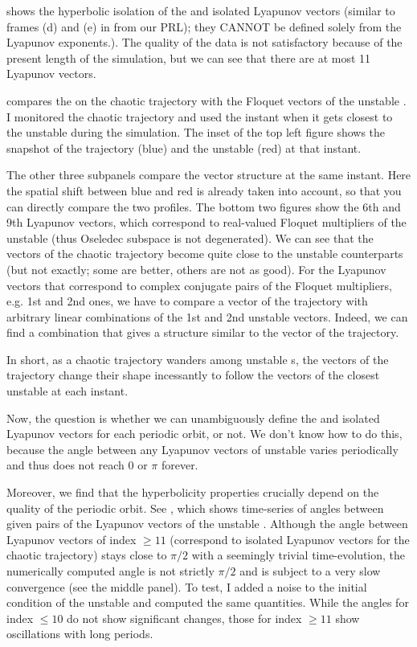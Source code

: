 \begin{description}
   shows the hyperbolic isolation of the {\entangled} and
  isolated Lyapunov vectors (similar to frames (d) and (e) in 
  from our PRL); they
  CANNOT be defined solely from the Lyapunov exponents.). The quality of
  the data is not satisfactory because of the present length of the
  simulation, but we can see that there are at most 11 {\entangled} Lyapunov vectors.


   compares the {\cLvs} on the
  chaotic trajectory with the Floquet vectors of the {unstable \po}. I monitored the
  chaotic trajectory and used the instant when it gets closest to the {unstable \po}
  during the simulation. The inset of the top left figure shows the
  snapshot of the trajectory (blue) and the {unstable \po} (red) at that instant.

  The other three subpanels compare the vector structure at the same
  instant. Here the spatial shift between blue and red is already taken
  into account, so that you can directly compare the two profiles. The
  bottom two figures show the 6th and 9th Lyapunov vectors, which correspond to
  real-valued Floquet multipliers of the {unstable \po} (thus Oseledec subspace is
  not degenerated). We can see that the vectors of the chaotic trajectory
  become quite close to the {unstable \po} counterparts (but not exactly; some are
  better, others are not as good). For the Lyapunov vectors that correspond
  to complex conjugate pairs of the Floquet multipliers, e.g. 1st and 2nd
  ones, we have to compare a vector of the trajectory with arbitrary
  linear combinations of the 1st and 2nd {unstable \po} vectors. Indeed, we can find
  a combination that gives a structure similar to the vector of the
  trajectory.

  In short, as a chaotic trajectory wanders among {unstable \po}s, the vectors of the
  trajectory change their shape incessantly to follow the vectors of the
  closest {unstable \po} at each instant.


  Now, the question is whether we can unambiguously define the {\entangled}
  and isolated Lyapunov vectors for each periodic orbit, or not. We don't know how to
  do this, because the angle between any Lyapunov vectors
  of {unstable \po} varies periodically and thus does not reach 0 or
  $\pi$ forever.

  Moreover, we find that the hyperbolicity properties crucially depend on
  the quality of the periodic orbit. See
  , which shows
  time-series of angles between given pairs of the Lyapunov vectors of the
  {unstable \po}. Although the angle between Lyapunov vectors of index $\geq 11$ (correspond
  to isolated Lyapunov vectors for the chaotic trajectory) stays close to $\pi/2$ with a
  seemingly trivial time-evolution, the numerically computed angle is not
  strictly $\pi/2$ and is subject to a very slow convergence (see the middle
  panel). To test, I added a noise to the initial condition of the {unstable \po} and
  computed the same quantities. While the angles for index $\leq 10$ do not
  show significant changes, those for index $\geq 11$ show {\transient}
  oscillations with long periods.


\end{description}
